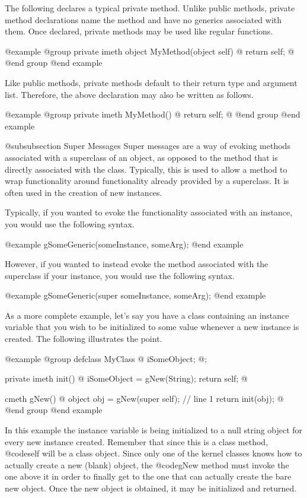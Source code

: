 The following declares a typical private method.  Unlike public
methods, private method declarations name the method and have
no generics associated with them.  Once declared, private methods may
be used like regular functions.


@example
@group
private imeth   object  MyMethod(object self)
@{
        return self;
@}
@end group
@end example


Like public methods, private methods default to their return type and
argument list.  Therefore, the above declaration may also be written as
follows.

@example
@group
private imeth   MyMethod()
@{
        return self;
@}
@end group
@end example


@subsubsection Super Messages
Super messages are a way of evoking methods associated with a superclass
of an object, as opposed to the method that is directly associated
with the class.  Typically, this is used to allow a method to wrap
functionality around functionality already provided by a superclass.
It is often used in the creation of new instances.

Typically, if you wanted to evoke the functionality associated with an
instance, you would use the following syntax.

@example
        gSomeGeneric(someInstance, someArg);
@end example

However, if you wanted to instead evoke the method associated with the
superclass if your instance, you would use the following syntax.

@example
        gSomeGeneric(super  someInstance, someArg);
@end example

As a more complete example, let's say you have a class containing an
instance variable that you wish to be initialized to some value
whenever a new instance is created.  The following illustrates the
point.

@example
@group
defclass  MyClass  @{
        iSomeObject;
@};

private imeth init()
@{
        iSomeObject = gNew(String);
        return self;
@}

cmeth  gNew()
@{
        object  obj = gNew(super self);  // line 1
        return init(obj);
@}
@end group
@end example

In this example the instance variable is being initialized to a null
string object for every new instance created.  Remember that since
this is a class method, @code{self} will be a class object.  Since
only one of the kernel classes knows how to actually create a new
(blank) object, the @code{gNew} method must invoke the one above it
in order to finally get to the one that can actually create the
bare new object.  Once the new object is obtained, it may be initialized
and returned.

